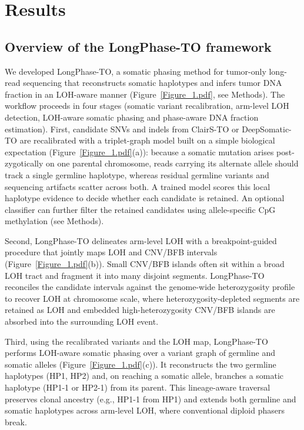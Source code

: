\documentclass[unnumsec,webpdf,contemporary,large]{oup-authoring-template}
\begin{document}
\section{Results}\label{results}

\subsection{Overview of the LongPhase-TO framework}
We developed LongPhase-TO, a somatic phasing method for tumor-only long-read sequencing that reconstructs somatic haplotypes and infers tumor DNA fraction in an LOH-aware manner (Figure~\ref{Figure_1.pdf}, see Methods). The workflow proceeds in four stages (somatic variant recalibration, arm-level LOH detection, LOH-aware somatic phasing and phase-aware DNA fraction estimation). First, candidate SNVs and indels from ClairS-TO or DeepSomatic-TO are recalibrated with a triplet-graph model built on a simple biological expectation (Figure~\ref{Figure_1.pdf}(a)): because a somatic mutation arises post-zygotically on one parental chromosome, reads carrying its alternate allele should track a single germline haplotype, whereas residual germline variants and sequencing artifacts scatter across both. A trained model scores this local haplotype evidence to decide whether each candidate is retained. An optional classifier can further filter the retained candidates using allele-specific CpG methylation (see Methods).

Second, LongPhase-TO delineates arm-level LOH with a breakpoint-guided procedure that jointly maps LOH and CNV/BFB intervals (Figure~\ref{Figure_1.pdf}(b)). Small CNV/BFB islands often sit within a broad LOH tract and fragment it into many disjoint segments. LongPhase-TO reconciles the candidate intervals against the genome-wide heterozygosity profile to recover LOH at chromosome scale, where heterozygosity-depleted segments are retained as LOH and embedded high-heterozygosity CNV/BFB islands are absorbed into the surrounding LOH event.

Third, using the recalibrated variants and the LOH map, LongPhase-TO performs LOH-aware somatic phasing over a variant graph of germline and somatic alleles (Figure~\ref{Figure_1.pdf}(c)). It reconstructs the two germline haplotypes (HP1, HP2) and, on reaching a somatic allele, branches a somatic haplotype (HP1-1 or HP2-1) from its parent. This lineage-aware traversal preserves clonal ancestry (e.g., HP1-1 from HP1) and extends both germline and somatic haplotypes across arm-level LOH, where conventional diploid phasers break.
\end{document}

